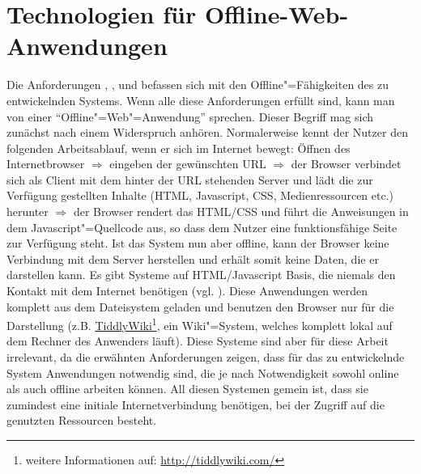 \section{Technologien für Offline-Web-Anwendungen}
Die Anforderungen , ,  und  befassen sich mit den Offline"=Fähigkeiten des zu entwickelnden Systems. Wenn alle diese Anforderungen erfüllt sind, kann man von einer "`Offline"=Web"=Anwendung"' sprechen. Dieser Begriff mag sich zunächst nach einem Widerspruch anhören. Normalerweise kennt der Nutzer den folgenden Arbeitsablauf, wenn er sich im Internet bewegt: Öffnen des Internetbrowser $\Rightarrow$ eingeben der gewünschten URL $\Rightarrow$ der Browser verbindet sich als Client mit dem hinter der URL stehenden Server und lädt die zur Verfügung gestellten Inhalte (HTML, Javascript, CSS, Medienressourcen etc.) herunter $\Rightarrow$ der Browser rendert das HTML/CSS und führt die Anweisungen in dem Javascript"=Quellcode aus, so dass dem Nutzer eine funktionsfähige Seite zur Verfügung steht. Ist das System nun aber offline, kann der Browser keine Verbindung mit dem Server herstellen und erhält somit keine Daten, die er darstellen kann. Es gibt Systeme auf HTML/Javascript Basis, die niemals den Kontakt mit dem Internet benötigen (vgl. \cite{Mahemoff22010}). Diese Anwendungen werden komplett aus dem Dateisystem geladen und benutzen den Browser nur für die Darstellung (z.B. \href{http://tiddlywiki.com}{TiddlyWiki}\footnote{weitere Informationen auf: \url{http://tiddlywiki.com/}}, ein Wiki"=System, welches komplett lokal auf dem Rechner des Anwenders läuft). Diese Systeme sind aber für diese Arbeit irrelevant, da die erwähnten Anforderungen zeigen, dass für das zu entwickelnde System Anwendungen notwendig sind, die je nach Notwendigkeit sowohl online als auch offline arbeiten können. All diesen Systemen gemein ist, dass sie zumindest eine initiale Internetverbindung benötigen, bei der Zugriff auf die genutzten Ressourcen besteht.


